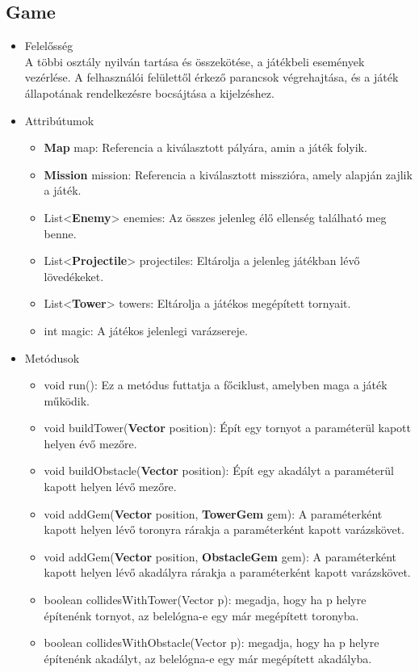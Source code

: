 \subsection{Game}
\begin{itemize}
\item Felelősség\\
A többi osztály nyilván tartása és összekötése, a játékbeli események vezérlése. A felhasználói felülettől érkező parancsok végrehajtása, és a játék állapotának rendelkezésre bocsájtása a kijelzéshez.
\item Attribútumok
	\begin{itemize}
		\item \textbf{Map} map: Referencia a kiválasztott pályára, amin a játék folyik.
		\item \textbf{Mission} mission: Referencia a kiválasztott misszióra, amely alapján zajlik a játék.
		\item List<\textbf{Enemy}> enemies: Az összes jelenleg élő ellenség található meg benne.
		\item List<\textbf{Projectile}> projectiles: Eltárolja a jelenleg játékban lévő lövedékeket.
		\item List<\textbf{Tower}> towers: Eltárolja a játékos megépített tornyait.
		\item int magic: A játékos jelenlegi varázsereje.
	\end{itemize}
\item Metódusok
	\begin{itemize}
		\item void run(): Ez a metódus futtatja a főciklust, amelyben maga a játék működik.
		\item void buildTower(\textbf{Vector} position): Épít egy tornyot a paraméterül kapott helyen évő mezőre.
		\item void buildObstacle(\textbf{Vector} position): Épít egy akadályt a paraméterül kapott helyen lévő mezőre.
		\item void addGem(\textbf{Vector} position, \textbf{TowerGem} gem): A paraméterként kapott helyen lévő toronyra rárakja a paraméterként kapott varázskövet.
		\item void addGem(\textbf{Vector} position, \textbf{ObstacleGem} gem): A paraméterként kapott helyen lévő akadályra rárakja a paraméterként kapott varázskövet.
		\item boolean collidesWithTower(Vector p): megadja, hogy ha p helyre építenénk tornyot, az belelógna-e egy már megépített toronyba.
		\item boolean collidesWithObstacle(Vector p): megadja, hogy ha p helyre építenénk akadályt, az belelógna-e egy már megépített akadályba.
	\end{itemize}
\end{itemize}




